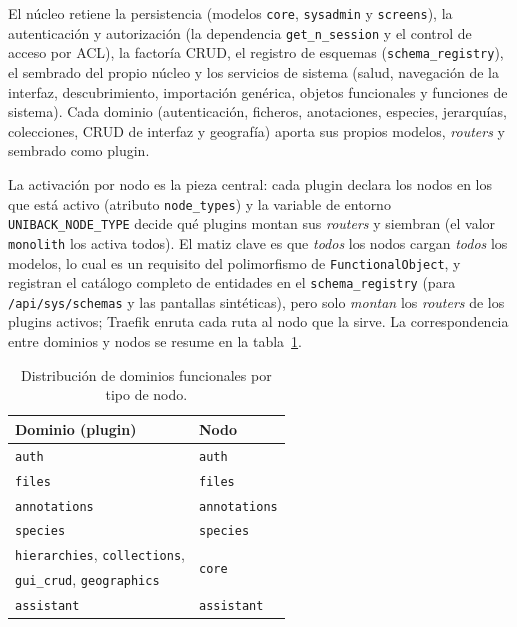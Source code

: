 El núcleo retiene la persistencia (modelos \texttt{core}, \texttt{sysadmin} y
\texttt{screens}), la autenticación y autorización (la dependencia
\texttt{get\_n\_session} y el control de acceso por ACL), la factoría CRUD, el
registro de esquemas (\texttt{schema\_registry}), el sembrado del propio núcleo
y los servicios de sistema (salud, navegación de la interfaz,
descubrimiento, importación genérica, objetos funcionales y funciones de
sistema). Cada dominio (autenticación, ficheros, anotaciones, especies,
jerarquías, colecciones, CRUD de interfaz y geografía) aporta sus propios
modelos, \emph{routers} y sembrado como plugin.

La activación por nodo es la pieza central: cada plugin declara los nodos en
los que está activo (atributo \texttt{node\_types}) y la variable de entorno
\texttt{UNIBACK\_NODE\_TYPE} decide qué plugins montan sus \emph{routers} y
siembran (el valor \texttt{monolith} los activa todos). El matiz clave es que
\emph{todos} los nodos cargan \emph{todos} los modelos, lo cual es un requisito del
polimorfismo de \texttt{FunctionalObject}, y registran el catálogo completo
de entidades en el \texttt{schema\_registry} (para \texttt{/api/sys/schemas} y
las pantallas sintéticas), pero solo \emph{montan} los \emph{routers} de los
plugins activos; Traefik enruta cada ruta al nodo que la sirve. La
correspondencia entre dominios y nodos se resume en la
tabla~\ref{tab:dominios-nodo}.

\begin{table}[!htbp]
\caption{Distribución de dominios funcionales por tipo de nodo.}
\label{tab:dominios-nodo}
\centering
\begin{tabular}{|l|l|}
\hline
\textbf{Dominio (plugin)} & \textbf{Nodo} \\ \hline
\texttt{auth} & \texttt{auth} \\ \hline
\texttt{files} & \texttt{files} \\ \hline
\texttt{annotations} & \texttt{annotations} \\ \hline
\texttt{species} & \texttt{species} \\ \hline
\texttt{hierarchies}, \texttt{collections}, & \multirow{2}{*}{\texttt{core}} \\
\texttt{gui\_crud}, \texttt{geographics} & \\ \hline
\texttt{assistant} & \texttt{assistant} \\ \hline
\end{tabular}
\end{table}

